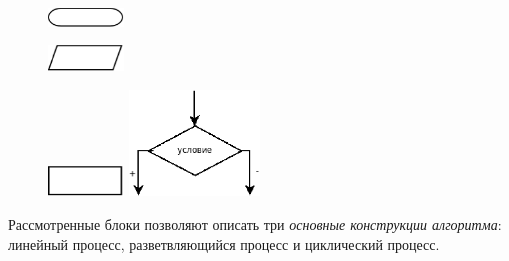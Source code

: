 {\footnotesize
   \begin{figure}%
   \begin{floatrow}[4]
   {\includegraphics[width=0.18\textwidth,keepaspectratio]{img/ris_3_1}}%

   {\includegraphics[width=0.18\textwidth,keepaspectratio]{img/ris_3_2}}%

   {\includegraphics[width=0.18\textwidth,keepaspectratio]{img/ris_3_3}}%
   {\includegraphics[width=0.31\textwidth,keepaspectratio]{img/ris_3_4}}%
   \end{floatrow}
   \end{figure}%
}

Рассмотренные блоки позволяют описать три \emph{основные конструкции
алгоритма}: линейный процесс, разветвляющийся процесс и циклический процесс.

